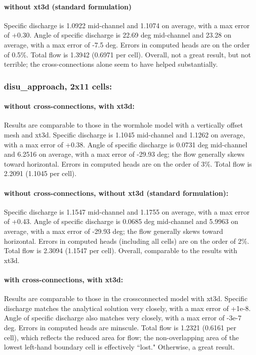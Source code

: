 \documentclass{article}
\begin{document}
\paragraph{without xt3d (standard formulation)}  Specific discharge is 1.0922 mid-channel and 1.1074 on average, with a max error of +0.30. Angle of specific discharge is 22.69 deg mid-channel and 23.28 on average, with a max error of -7.5 deg. Errors in computed heads are on the order of 0.5\%. Total flow is 1.3942 (0.6971 per cell). Overall, not a great result, but not terrible; the cross-connections alone seem to have helped substantially.

\subsubsection{disu\_approach, 2x11 cells:}

\paragraph{without cross-connections, with xt3d:} Results are comparable to those in the wormhole model with a vertically offset mesh and xt3d. Specific discharge is 1.1045 mid-channel and 1.1262 on average, with a max error of +0.38. Angle of specific discharge is 0.0731 deg mid-channel and 6.2516 on average, with a max error of -29.93 deg; the flow generally skews toward horizontal. Errors in computed heads are on the order of 3\%. Total flow is 2.2091 (1.1045 per cell).

\paragraph{without cross-connections, without xt3d (standard formulation):} Specific discharge is 1.1547 mid-channel and 1.1755 on average, with a max error of +0.43. Angle of specific discharge is 0.0685 deg mid-channel and 5.9963 on average, with a max error of -29.93 deg; the flow generally skews toward horizontal. Errors in computed heads (including all cells) are on the order of 2\%. Total flow is 2.3094 (1.1547 per cell). Overall, comparable to the results with xt3d.

\paragraph{with cross-connections, with xt3d:} Results are comparable to those in the crossconnected model with xt3d. Specific discharge matches the analytical solution very closely, with a max error of +1e-8. Angle of specific discharge also matches very closely, with a max error of -3e-7 deg. Errors in computed heads are minscule. Total flow is 1.2321 (0.6161 per cell), which reflects the reduced area for flow; the non-overlapping area of the lowest left-hand boundary cell is effectively ``lost." Otherwise, a great result.
\end{document}
